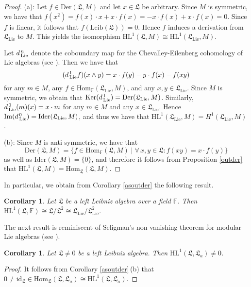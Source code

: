 \documentclass{amsart}
\newtheorem{cor}[thm]{Corollary}
\numberwithin{equation}{section}
\newcommand{\id}{\mathrm{id}}
\newcommand{\der}{\mathrm{Der}}
\newcommand{\ider}{\mathrm{Ider}}
\newcommand{\lie}{\mathrm{Lie}}
\newcommand{\leib}{\mathrm{Leib}}
\newcommand{\Ker}{\mathrm{Ker}}
\newcommand{\im}{\mathrm{Im}}
\newcommand{\Hom}{\mathrm{Hom}}
\newcommand{\HL}{\mathrm{HL}}
\newcommand{\F}{\mathbb{F}}
\newcommand{\lf}{\mathfrak{L}}
\begin{document}
\begin{proof}
(a): Let $f\in\der(\lf,M)$ and let $x\in\lf$ be arbitrary. Since $M$ is symmetric, we have that $f(x^2)
=f(x)\cdot x+x\cdot f(x)=-x\cdot f(x)+x\cdot f(x)=0$. Since $f$ is linear, it follows that $f(\leib(\lf))
=0$. Hence $f$ induces a derivation from $\lf_\lie$ to $M$. This yields the isomorphism $\HL^1(\lf,M)
\cong\HL^1(\lf_\lie,M)$.

Let $d\hspace{.4mm}^n_\lie$ denote the coboundary map for the Chevalley-Eilenberg cohomology
of Lie algebras (see \cite[Exercise I.3.12]{Bou}). Then we have that $$(d\hspace{.4mm}^1_\lie f)
(x\wedge y)=x\cdot f(y)-y\cdot f(x)-f(xy)$$ for any $m\in M$, any $f\in\Hom_\F(\lf_\lie,M)$, and
any $x,y\in\lf_\lie$. Since $M$ is symmetric, we obtain that $\Ker(d\hspace{.4mm}^1_\lie)=\der(
\lf_\lie,M)$. Similarly, $d\hspace{.4mm}^0_\lie(m)(x)=x\cdot m$ for any $m\in M$ and any $x\in\lf_\lie$.
Hence $\im(d\hspace{.4mm}^0_\lie)=\ider(\lf_\lie,M)$, and thus we have that $\HL^1(\lf_\lie,M)=
H^1(\lf_\lie,M)$.

(b): Since $M$ is anti-symmetric, we have that $$\der(\lf,M)=\{f\in\Hom_\F(\lf,M)\mid\forall\,x,y
\in\lf:f(xy)=x\cdot f(y)\}$$ as well as $\ider(\lf,M)=\{0\}$, and therefore it follows from Proposition
\ref{outder} that $\HL^1(\lf,M)=\Hom_\lf(\lf,M)$.
\end{proof}

In particular, we obtain from Corollary \ref{asoutder} the following result.

\begin{cor}\label{triv}
Let $\lf$ be a left Leibniz algebra over a field $\F$. Then $\HL^1(\lf,\F)\cong\lf/\lf^2\cong\lf_\lie/
\lf_\lie^2$.
\end{cor}

The next result is reminiscent of Seligman's non-vanishing theorem for modular Lie algebras (see
\cite[p. 102]{Se}).

\begin{cor}\label{asadj}
Let $\lf\ne 0$ be a left Leibniz algebra. Then $\HL^1(\lf,\lf_a)\ne 0$.
\end{cor}

\begin{proof}
It follows from Corollary \ref{asoutder}\,(b) that $0\ne\id_\lf\in\Hom_\lf(\lf,\lf_a)\cong\HL^1
(\lf,\lf_a)$.
\end{proof}
\end{document}
